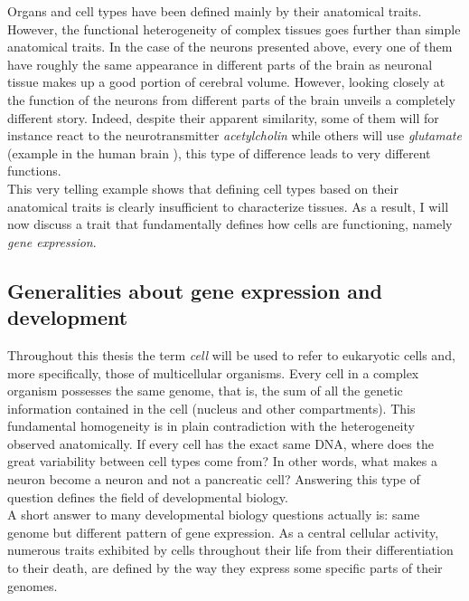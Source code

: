      
    Organs and cell types have been defined mainly by their anatomical traits. However, the functional heterogeneity of complex tissues goes further than simple anatomical traits. In the case of the neurons presented above, every one of them have roughly the same appearance in different parts of the brain as neuronal tissue makes up a good portion of cerebral volume. However, looking closely at the function of the neurons from different parts of the brain unveils a completely different story. Indeed, despite their apparent similarity, some of them will for instance react to the neurotransmitter \emph{acetylcholin} while others will use \emph{glutamate} (example in the human brain \cite{hefti86,van93}), this type of difference leads to very different functions.\\
     
     This very telling example shows that defining cell types based on their anatomical traits is clearly insufficient to characterize tissues.  As a result, I will now discuss a trait that fundamentally defines how cells are functioning, namely \emph{gene expression}. 

\subsection{Generalities about gene expression and development}\label{sec:gene_expression_background}     
       
     Throughout this thesis the term \emph{cell} will be used to refer to eukaryotic cells and, more specifically, those of multicellular organisms. Every cell in a complex organism possesses the same genome, that is, the sum of all the genetic information contained in the cell (nucleus and other compartments). This fundamental homogeneity is in plain contradiction with the heterogeneity observed anatomically. If every cell has the exact same DNA, where does the great variability between cell types come from? In other words, what makes a neuron become a neuron and not a pancreatic cell? Answering this type of question defines the field of developmental biology.\\
     
     A short answer to many developmental biology questions actually is: same genome but different pattern of gene expression. As a central cellular activity, numerous traits exhibited by cells throughout their life from their differentiation to their death, are defined by the way they express some specific parts of their genomes.\\

